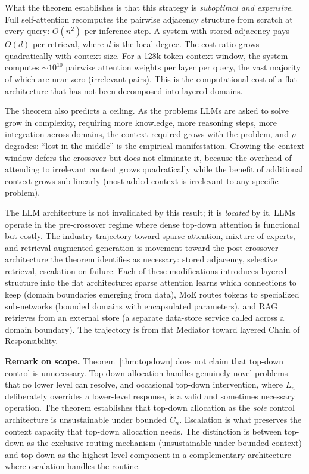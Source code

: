 \documentclass[11pt]{article}
\theoremstyle{definition}
\begin{document}
What the theorem establishes is that this strategy is
\emph{suboptimal and expensive}. Full self-attention recomputes the
pairwise adjacency structure from scratch at every query: $O(n^2)$ per
inference step. A system with stored adjacency pays $O(d)$ per
retrieval, where $d$ is the local degree. The cost ratio grows
quadratically with context size. For a 128k-token context window, the
system computes ${\sim}10^{10}$ pairwise attention weights per layer per
query, the vast majority of which are near-zero (irrelevant pairs). This
is the computational cost of a flat architecture that has not been
decomposed into layered domains.

The theorem also predicts a ceiling. As the problems LLMs are asked to
solve grow in complexity, requiring more knowledge, more reasoning
steps, more integration across domains, the context required grows
with the problem, and $\rho$ degrades: ``lost in the middle''
\cite{Liu2024} is the empirical manifestation. Growing the context
window defers the crossover but does not eliminate it, because the
overhead of attending to irrelevant content grows quadratically while
the benefit of additional context grows sub-linearly (most added context
is irrelevant to any specific problem).

The LLM architecture is not invalidated by this result; it is
\emph{located} by it. LLMs operate in the pre-crossover regime where
dense top-down attention is functional but costly. The industry
trajectory toward sparse attention, mixture-of-experts, and
retrieval-augmented generation is movement toward the post-crossover
architecture the theorem identifies as necessary: stored adjacency,
selective retrieval, escalation on failure. Each of these modifications
introduces layered structure into the flat architecture: sparse
attention learns which connections to keep (domain boundaries emerging
from data), MoE routes tokens to specialized sub-networks (bounded
domains with encapsulated parameters), and RAG retrieves from an
external store (a separate data-store service called across a domain
boundary). The trajectory is from flat Mediator toward layered Chain
of Responsibility.

\textbf{Remark on scope.} Theorem~\ref{thm:topdown} does not claim
that top-down control is unnecessary. Top-down allocation handles
genuinely novel problems that no lower level can resolve, and
occasional top-down intervention, where $L_n$ deliberately overrides a
lower-level response, is a valid and sometimes necessary operation. The
theorem establishes that top-down allocation as the \emph{sole} control
architecture is unsustainable under bounded $C_n$. Escalation is what
preserves the context capacity that top-down allocation needs. The
distinction is between top-down as the exclusive routing mechanism
(unsustainable under bounded context) and top-down as the
highest-level component in a complementary architecture where
escalation handles the routine.
\end{document}
